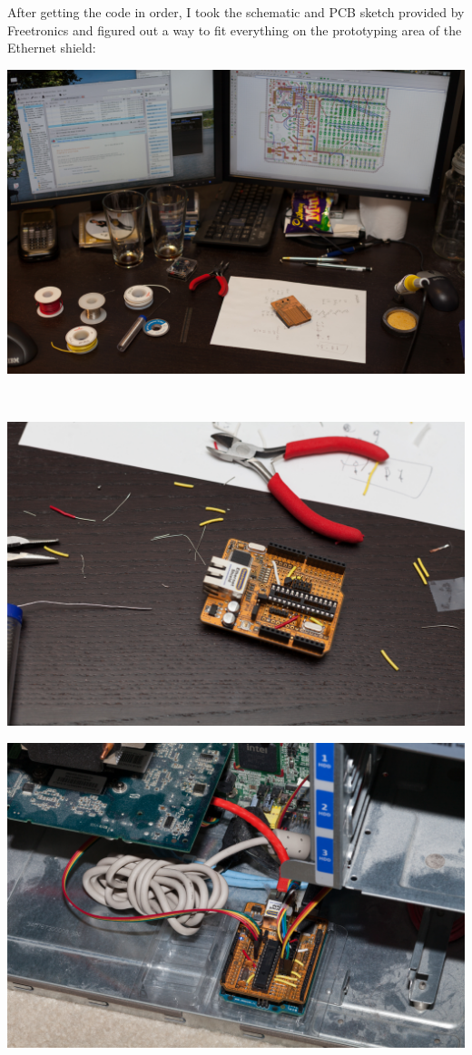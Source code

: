 \documentclass{amsart}
\begin{document}
After getting the code in order, I took the schematic and PCB sketch provided by Freetronics and figured out a way to fit everything on the prototyping area of the Ethernet shield:
\\
\begin{center}
\includegraphics[width=.9\textwidth]{lom-07.jpg}
\end{center}
\ \\
\begin{center}
\includegraphics[width=.9\textwidth]{lom-10.jpg}
\end{center}



\begin{landscape}
\noindent\thispagestyle{empty}
\parbox[c][\textwidth][s]{\linewidth}{%
\vfill
\includegraphics[width=\linewidth]{lom-14.jpg}
\vfill
}
\end{landscape}
\restoregeometry
\end{document}
